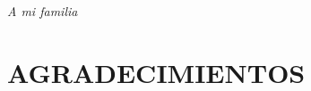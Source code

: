 \documentclass[12pt]{article}
\providecommand\phantomsection{} %
\begin{document}
%
%

\newpage
\phantomsection
{}
\vspace*{7cm}
\begin{flushright}
\textit{\Large A mi familia}
\end{flushright}

\newpage
\phantomsection
\section*{\centering AGRADECIMIENTOS}
\end{document}
